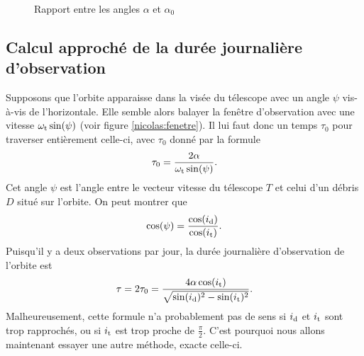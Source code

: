 \begin{figure}
\begin{center}
\scriptsize
\def\figurewidth{0.6\linewidth}

\caption{Rapport entre les angles $\alpha$ et $\alpha_0$} \label{nicolas:alpha}
\end{center}
\end{figure}


\subsection{Calcul approché de la durée journalière d'observation}

Supposons que l'orbite apparaisse dans la visée du télescope avec un angle $\psi$ vis-à-vis de l'horizontale. Elle semble alors balayer la fenêtre d'observation avec une vitesse $\omega_\text{t} \sin(\psi)$ (voir figure \ref{nicolas:fenetre}). Il lui faut donc un temps $\tau_0$ pour traverser entièrement celle-ci, avec $\tau_0$ donné par la formule
\[ \tau_0 = \frac{2\alpha}{\omega_\text{t} \sin(\psi)}.\]
Cet angle $\psi$ est l'angle entre le vecteur vitesse du télescope $T$ et celui d'un débris $D$ situé sur l'orbite. 
On peut montrer que
\[ 
\cos(\psi) = \frac{\cos(i_\text{d})}{\cos(i_\text{t})}.
\]
Puisqu'il y a deux observations par jour, la durée journalière d'observation de l'orbite est
\[ \tau = 2\tau_0 = \frac{4\alpha\cos(i_\text{t})}{\sqrt{\sin(i_\text{d})^2 - \sin(i_\text{t})^2}}.\]
Malheureusement, cette formule n'a probablement pas de sens si $i_\text{d}$ et $i_\text{t}$ sont trop rapprochés, ou si $i_\text{t}$ est trop proche de $\frac{\pi}{2}$. C'est pourquoi nous allons maintenant essayer une autre méthode, exacte celle-ci.

